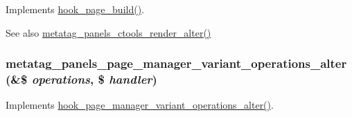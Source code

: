 \label{metatag__panels_8module_aedd357c1991b0fcabfbaeed6f37ab2fe}
Implements \hyperlink{group__hooks_ga16d8d8ae818dc759bbe539e16ff5b93b}{hook\_\-page\_\-build()}.

\begin{DoxySeeAlso}{See also}
\hyperlink{metatag__panels_8module_a32cbb441f027447babe1a3a95999ebc8}{metatag\_\-panels\_\-ctools\_\-render\_\-alter()} 
\end{DoxySeeAlso}
\hypertarget{metatag__panels_8module_ac76e277f850f74fee4cf1f966660a151}{
\subsubsection[{metatag\_\-panels\_\-page\_\-manager\_\-variant\_\-operations\_\-alter}]{\setlength{\rightskip}{0pt plus 5cm}metatag\_\-panels\_\-page\_\-manager\_\-variant\_\-operations\_\-alter (\&\$ {\em operations}, \/  \$ {\em handler})}}
\label{metatag__panels_8module_ac76e277f850f74fee4cf1f966660a151}
Implements \hyperlink{group__hooks_gaf5d4ce054cae22b3bdca52011c6e8fbc}{hook\_\-page\_\-manager\_\-variant\_\-operations\_\-alter()}. 